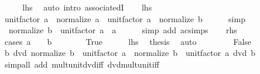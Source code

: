 \begin{isabellebody}
\ \ \isamarkupfalse%
\ \isamarkupfalse%
\ {\isacharquery}{\kern0pt}lhs\ \isamarkupfalse%
\ {\isacharparenleft}{\kern0pt}auto\ intro{\isacharbang}{\kern0pt}{\isacharcolon}{\kern0pt}\ associatedI{\isacharparenright}{\kern0pt}\isanewline
{}\isamarkupfalse%
\isanewline
\ \ \isamarkupfalse%
\ {\isacharquery}{\kern0pt}lhs\isanewline
\ \ \isamarkupfalse%
\ \isamarkupfalse%
\ {\isachardoublequoteopen}unit{\isacharunderscore}{\kern0pt}factor\ a\ {\isacharasterisk}{\kern0pt}\ normalize\ a\ {\isacharequal}{\kern0pt}\ unit{\isacharunderscore}{\kern0pt}factor\ a\ {\isacharasterisk}{\kern0pt}\ normalize\ b{\isachardoublequoteclose}\isanewline
\ \ \ \ \isamarkupfalse%
\ simp\isanewline
\ \ \isamarkupfalse%
\ \isamarkupfalse%
\ {\isacharasterisk}{\kern0pt}{\isacharcolon}{\kern0pt}\ {\isachardoublequoteopen}normalize\ b\ {\isacharasterisk}{\kern0pt}\ unit{\isacharunderscore}{\kern0pt}factor\ a\ {\isacharequal}{\kern0pt}\ a{\isachardoublequoteclose}\isanewline
\ \ \ \ \isamarkupfalse%
\ {\isacharparenleft}{\kern0pt}simp\ add{\isacharcolon}{\kern0pt}\ ac{\isacharunderscore}{\kern0pt}simps{\isacharparenright}{\kern0pt}\isanewline
\ \ \isamarkupfalse%
\ {\isacharquery}{\kern0pt}rhs\isanewline
\ \ \isamarkupfalse%
\ {\isacharparenleft}{\kern0pt}cases\ {\isachardoublequoteopen}a\ {\isacharequal}{\kern0pt}\ {}\ {\isasymor}\ b\ {\isacharequal}{\kern0pt}\ {}{\isachardoublequoteclose}{\isacharparenright}{\kern0pt}\isanewline
\ \ \ \ \isamarkupfalse%
\ True\isanewline
\ \ \ \ \isamarkupfalse%
\ {\isacartoucheopen}{\isacharquery}{\kern0pt}lhs{\isacartoucheclose}\ \isamarkupfalse%
\ {\isacharquery}{\kern0pt}thesis\ \isamarkupfalse%
\ auto\isanewline
\ \ \isamarkupfalse%
\isanewline
\ \ \ \ \isamarkupfalse%
\ False\isanewline
\ \ \ \ \isamarkupfalse%
\ \isamarkupfalse%
\ {\isachardoublequoteopen}b\ dvd\ normalize\ b\ {\isacharasterisk}{\kern0pt}\ unit{\isacharunderscore}{\kern0pt}factor\ a{\isachardoublequoteclose}\ \ {\isachardoublequoteopen}normalize\ b\ {\isacharasterisk}{\kern0pt}\ unit{\isacharunderscore}{\kern0pt}factor\ a\ dvd\ b{\isachardoublequoteclose}\isanewline
\ \ \ \ \ \ \isamarkupfalse%
\ {\isacharparenleft}{\kern0pt}simp{\isacharunderscore}{\kern0pt}all\ add{\isacharcolon}{\kern0pt}\ mult{\isacharunderscore}{\kern0pt}unit{\isacharunderscore}{\kern0pt}dvd{\isacharunderscore}{\kern0pt}iff\ dvd{\isacharunderscore}{\kern0pt}mult{\isacharunderscore}{\kern0pt}unit{\isacharunderscore}{\kern0pt}iff{\isacharparenright}{\kern0pt}\isanewline

\end{isabellebody}
